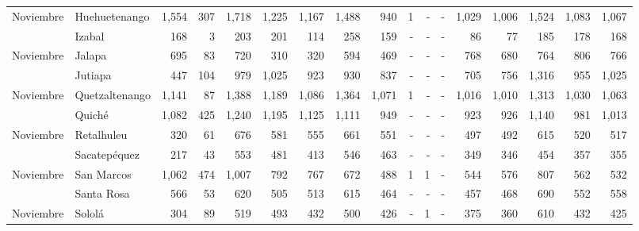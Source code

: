 \begin{landscape}
\begin{center}
\begin{longtable}{llrrrrrrrrrrrrrrr}
			\multicolumn{1}{l}{	\footnotesize	 Noviembre 	}&	 Huehuetenango 	&	 1,554 	&	 307 	&	 1,718 	&	 1,225 	&	 1,167 	&	 1,488 	&	 940 	&	 1 	&	 -   	&	 -   	&	 1,029 	&	 1,006 	&	 1,524 	&	 1,083 	&	 1,067 	\\
			\rowcolor{color1!5!white}\multicolumn{1}{l}{	\footnotesize	 Noviembre 	}&	 Izabal 	&	 168 	&	 3 	&	 203 	&	 201 	&	 114 	&	 258 	&	 159 	&	 -   	&	 -   	&	 -   	&	 86 	&	 77 	&	 185 	&	 178 	&	 168 	\\
			\multicolumn{1}{l}{	\footnotesize	 Noviembre 	}&	 Jalapa 	&	 695 	&	 83 	&	 720 	&	 310 	&	 320 	&	 594 	&	 469 	&	 -   	&	 -   	&	 -   	&	 768 	&	 680 	&	 764 	&	 806 	&	 766 	\\
			\rowcolor{color1!5!white}\multicolumn{1}{l}{	\footnotesize	 Noviembre 	}&	 Jutiapa 	&	 447 	&	 104 	&	 979 	&	 1,025 	&	 923 	&	 930 	&	 837 	&	 -   	&	 -   	&	 -   	&	 705 	&	 756 	&	 1,316 	&	 955 	&	 1,025 	\\
			\multicolumn{1}{l}{	\footnotesize	 Noviembre 	}&	 Quetzaltenango 	&	 1,141 	&	 87 	&	 1,388 	&	 1,189 	&	 1,086 	&	 1,364 	&	 1,071 	&	 1 	&	 -   	&	 -   	&	 1,016 	&	 1,010 	&	 1,313 	&	 1,030 	&	 1,063 	\\
			\rowcolor{color1!5!white}\multicolumn{1}{l}{	\footnotesize	 Noviembre 	}&	 Quiché 	&	 1,082 	&	 425 	&	 1,240 	&	 1,195 	&	 1,125 	&	 1,111 	&	 949 	&	 -   	&	 -   	&	 -   	&	 923 	&	 926 	&	 1,140 	&	 981 	&	 1,013 	\\
			\multicolumn{1}{l}{	\footnotesize	 Noviembre 	}&	 Retalhuleu 	&	 320 	&	 61 	&	 676 	&	 581 	&	 555 	&	 661 	&	 551 	&	 -   	&	 -   	&	 -   	&	 497 	&	 492 	&	 615 	&	 520 	&	 517 	\\
			\rowcolor{color1!5!white}\multicolumn{1}{l}{	\footnotesize	 Noviembre 	}&	 Sacatepéquez 	&	 217 	&	 43 	&	 553 	&	 481 	&	 413 	&	 546 	&	 463 	&	 -   	&	 -   	&	 -   	&	 349 	&	 346 	&	 454 	&	 357 	&	 355 	\\
			\multicolumn{1}{l}{	\footnotesize	 Noviembre 	}&	 San Marcos 	&	 1,062 	&	 474 	&	 1,007 	&	 792 	&	 767 	&	 672 	&	 488 	&	 1 	&	 1 	&	 -   	&	 544 	&	 576 	&	 807 	&	 562 	&	 532 	\\
			\rowcolor{color1!5!white}\multicolumn{1}{l}{	\footnotesize	 Noviembre 	}&	 Santa Rosa 	&	 566 	&	 53 	&	 620 	&	 505 	&	 513 	&	 615 	&	 464 	&	 -   	&	 -   	&	 -   	&	 457 	&	 468 	&	 690 	&	 552 	&	 558 	\\
			\multicolumn{1}{l}{	\footnotesize	 Noviembre 	}&	 Sololá 	&	 304 	&	 89 	&	 519 	&	 493 	&	 432 	&	 500 	&	 426 	&	 -   	&	 1 	&	 -   	&	 375 	&	 360 	&	 610 	&	 432 	&	 425 	\\

\end{longtable}
\end{center}
\end{landscape}
